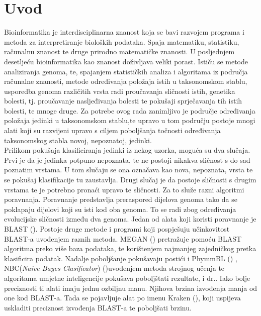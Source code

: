 \documentclass[times, utf8, zavrsni]{fer}
\begin{document}
\chapter{Uvod}
Bioinformatika je interdisciplinarna znanost koja se bavi razvojem programa i metoda za interpretiranje bioloških podataka. Spaja matematiku, statistiku, računalnu znanost te druge prirodno matematičke znanosti. U posljednjem desetljeću bioinformatika kao znanost doživljava veliki porast. Ističu se metode analiziranja genoma, te, spajanjem statističkih analiza i algoritama iz područja računalne znanosti, metode određivanja položaja istih u taksonomskom stablu, usporedba genoma različitih vrsta radi proučavanja sličnosti istih, genetika bolesti, tj. proučavanje nasljeđivanja bolesti te pokušaji sprječavanja tih istih bolesti, te mnoge druge. Za potrebe ovog rada zanimljivo je područje određivanja položaja jedinki u taksonomskom stablu,te upravo u tom području postoje mnogi alati koji su razvijeni upravo s ciljem poboljšanja točnosti određivanja taksonomskog stabla novoj, nepoznatoj, jedinki.
\\Prilikom pokušaja klasificiranja jedinki iz nekog uzorka, moguća su dva slučaja. Prvi je da je jedinka potpuno nepoznata, te ne postoji nikakva sličnost s do sad poznatim vrstama. U tom slučaju se ona označava kao nova, nepoznata, vrsta te se pokušaj klasifikacije tu zaustavlja. Drugi slučaj je da postoje sličnosti s drugim vrstama te je potrebno pronaći upravo te sličnosti. Za to služe razni algoritmi poravnanja. Poravnanje predstavlja preraspored dijelova genoma tako da se poklapaju dijelovi koji su isti kod oba genoma. To se radi zbog određivanja evolucijske sličnosti između dva genoma. Jedan od alata koji koristi poravnanje je BLAST (\cite{Blast}). Postoje druge metode i programi koji pospješuju učinkovitost BLAST-a uvođenjem raznih metoda. MEGAN (\cite{Megan}) pretražuje pomoću BLAST algoritma preko više baza podataka, te korištenjem najmanjeg zajedničkog pretka klasificira podatak. Nadalje poboljšanje pokušavaju postići i PhymmBL (\cite{PhymmBL}) , NBC(\textit{Naive Bayes Clasificator}) (\cite{NBC})uvođenjem metoda strojnog učenja te algoritama umjetne inteligencije pokušava poboljštati rezultate, i dr.. Iako bolje preciznosti ti alati imaju jednu ozbiljnu manu. Njihova brzina izvođenja manja od one kod BLAST-a. Tada se pojavljuje alat po imenu Kraken (\cite{Kraken}), koji uspijeva uskladiti preciznost izvođenja BLAST-a te poboljšati brzinu.
\end{document}
